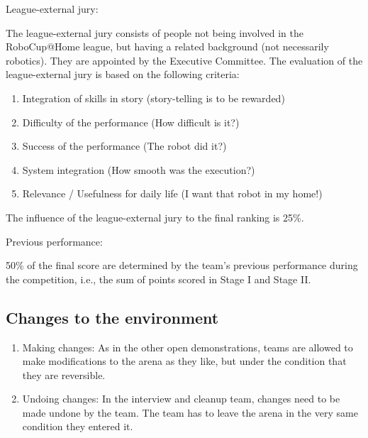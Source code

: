 \begin{enumerate}
  {\bf\item League-external jury:} The league-external jury consists of people not being involved in the RoboCup@Home league, but having a related background (not necessarily robotics). They are appointed by the Executive Committee. The evaluation of the league-external jury is based on the following criteria:
  \begin{enumerate}
    \item Integration of skills in story (story-telling is to be rewarded)
    \item Difficulty of the performance (How difficult is it?)
    \item Success of the performance (The robot did it?)
    \item System integration (How smooth was the execution?)
    \item Relevance / Usefulness for daily life (I want that robot in my home!)
  \end{enumerate}

  The influence of the league-external jury to the final ranking is 25\%. \\

  {\bf\item Previous performance:} 50\% of the final score are determined by the team's previous performance during the competition, i.e., the sum of points scored in Stage I and Stage II.
\end{enumerate}

\subsection{Changes to the environment}
\begin{enumerate}
  \item Making changes: As in the other open demonstrations, teams are allowed to make modifications to the arena as they like, but under the condition that they are reversible.
  \item Undoing changes: In the interview and cleanup team, changes need to be made undone by the team. The team has to leave the arena in the very same condition they entered it.
\end{enumerate}

